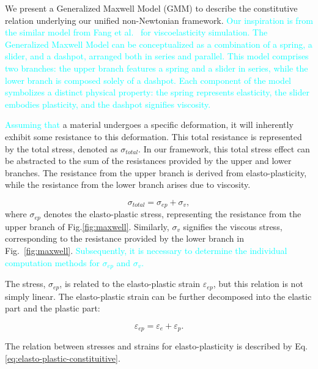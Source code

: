 \documentclass[10pt,journal,compsoc]{IEEEtran}
\newcommand{\revised}[1]{{\textcolor{cyan}{#1}}}
\begin{document}
We present a Generalized Maxwell Model (GMM) to describe the constitutive relation underlying our unified non-Newtonian framework. \revised{Our inspiration is from the similar model from Fang et al.~\cite{Fang2019-sillyRubber} for viscoelasticity simulation. The Generalized Maxwell Model can be conceptualized as a combination of a spring, a slider, and a dashpot, arranged both in series and parallel. This model comprises two branches: the upper branch features a spring and a slider in series, while the lower branch is composed solely of a dashpot. Each component of the model symbolizes a distinct physical property: the spring represents elasticity, the slider embodies plasticity, and the dashpot signifies viscosity.}

\revised{Assuming that} a material undergoes a specific deformation, it will inherently exhibit some resistance to this deformation. This total resistance is represented by the total stress, denoted as $\sigma_{total}$. In our framework, this total stress effect can be abstracted to the sum of the resistances provided by the upper and lower branches. The resistance from the upper branch is derived from elasto-plasticity, while the resistance from the lower branch arises due to viscosity.

\begin{equation}
	\sigma_{total} = \sigma_{ep} + \sigma_v,
\end{equation}
where $\sigma_{ep}$ denotes the elasto-plastic stress, representing the resistance from the upper branch of Fig.\ref{fig:maxwell}. Similarly, $\sigma_v$ signifies the viscous stress, corresponding to the resistance provided by the lower branch in Fig.~\ref{fig:maxwell}.
\revised{Subsequently, it is necessary to determine the individual computation methods for $\sigma_{ep}$ and $\sigma_v$.}



The stress, $\sigma_{ep}$, is related to the elasto-plastic strain $\varepsilon_{ep}$, but this relation is not simply linear. The elasto-plastic strain can be further decomposed into the elastic part and the plastic part:


\begin{equation}
	\varepsilon_{ep} = \varepsilon_{e} + \varepsilon_{p}. \label{eq:addition_law_strain}
\end{equation}

The relation between stresses and strains for elasto-plasticity is described by Eq.\ref{eq:elasto-plastic-constituitive}.
\end{document}
